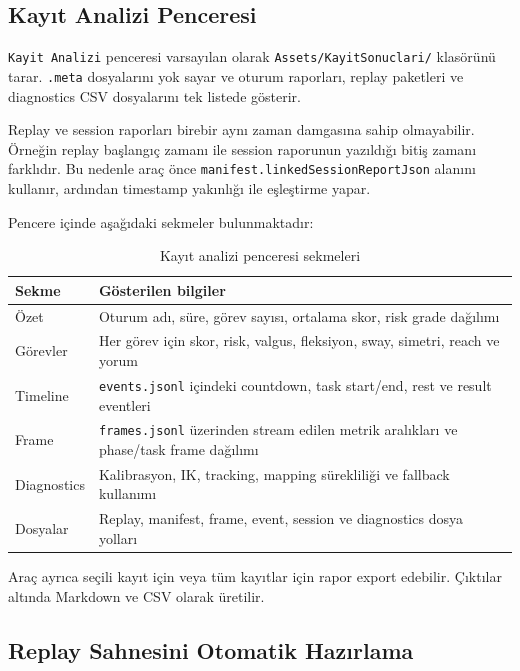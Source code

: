 \documentclass[11pt,a4paper]{article}
\begin{document}
\subsection{Kayıt Analizi Penceresi}

\texttt{Kayit Analizi} penceresi varsayılan olarak
\texttt{Assets/KayitSonuclari/} klasörünü tarar. \texttt{.meta} dosyalarını
yok sayar ve oturum raporları, replay paketleri ve diagnostics CSV dosyalarını
tek listede gösterir.

Replay ve session raporları birebir aynı zaman damgasına sahip olmayabilir.
Örneğin replay başlangıç zamanı ile session raporunun yazıldığı bitiş zamanı
farklıdır. Bu nedenle araç önce \texttt{manifest.linkedSessionReportJson}
alanını kullanır, ardından timestamp yakınlığı ile eşleştirme yapar.

Pencere içinde aşağıdaki sekmeler bulunmaktadır:

\begin{table}[H]
\centering
\caption{Kayıt analizi penceresi sekmeleri}
\label{tab:analysis_tabs}
\renewcommand{\arraystretch}{1.22}
\begin{tabularx}{\textwidth}{lX}
\toprule
\textbf{Sekme} & \textbf{Gösterilen bilgiler} \\
\midrule
Özet & Oturum adı, süre, görev sayısı, ortalama skor, risk grade dağılımı \\
Görevler & Her görev için skor, risk, valgus, fleksiyon, sway, simetri, reach ve yorum \\
Timeline & \texttt{events.jsonl} içindeki countdown, task start/end, rest ve result eventleri \\
Frame & \texttt{frames.jsonl} üzerinden stream edilen metrik aralıkları ve phase/task frame dağılımı \\
Diagnostics & Kalibrasyon, IK, tracking, mapping sürekliliği ve fallback kullanımı \\
Dosyalar & Replay, manifest, frame, event, session ve diagnostics dosya yolları \\
\bottomrule
\end{tabularx}
\end{table}

Araç ayrıca seçili kayıt için veya tüm kayıtlar için rapor export edebilir.
Çıktılar  altında Markdown ve CSV
olarak üretilir.

\subsection{Replay Sahnesini Otomatik Hazırlama}
\end{document}
